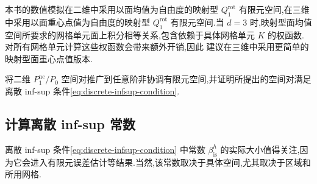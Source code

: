 \begin{note}\label{note:qrot-practical-use}
本书的数值模拟在二维中采用以面均值为自由度的映射型 $Q_1^{\mathrm{rot}}$ 有限元空间,在三维中采用以面重心点值为自由度的映射型 $Q_1^{\mathrm{rot}}$ 有限元空间.当 $d=3$ 时,映射型面均值空间所要求的网格单元面上积分相等关系,包含依赖于具体网格单元 $K$ 的权函数.对所有网格单元计算这些权函数会带来额外开销,因此\textcite[第 21 页]{Schieweck1997} 建议在三维中采用更简单的映射型面重心点值版本.
\end{note}

\begin{note}[高阶非协调有限元空间]\label{note:higher-order-nonconforming}
\textcite{MatthiesTobiska2005} 将二维 $P_1^{\mathrm{nc}}/P_0$ 空间对推广到任意阶非协调有限元空间,并证明所提出的空间对满足离散 inf-sup 条件\cref{eq:discrete-infsup-condition}.
\end{note}

\subsection{计算离散 inf-sup 常数}\label{sec:computing-discrete-infsup}

\begin{note}\label{note:discrete-infsup-independence}
离散 inf-sup 条件\cref{eq:discrete-infsup-condition} 中常数 $\beta_{\mathrm{is}}^h$ 的实际大小值得关注,因为它会进入有限元误差估计等结果.当然,该常数取决于具体空间,尤其取决于区域和所用网格.
\end{note}

